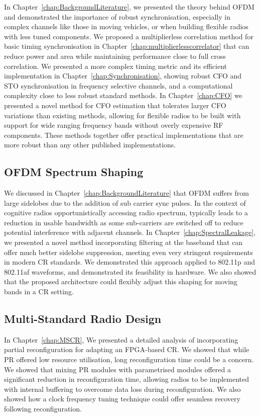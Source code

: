 In Chapter~\ref{chap:BackgroundLiterature}, we presented the theory behind OFDM and demonstrated the importance of robust synchronisation, especially in complex channels like those in moving vehicles, or when building flexible radios with less tuned components.
We proposed a multiplierless correlation method for basic timing synchronisation in Chapter~\ref{chap:multiplierlesscorrelator} that can reduce power and area while maintaining performance close to full cross correlation.
We presented a more complex timing metric and its efficient implementation in Chapter~\ref{chap:Synchronisation}, showing robust CFO and STO synchronisation in frequency selective channels, and a computational complexity close to less robust standard methods.
In Chapter~\ref{chap:CFO} we presented a novel method for CFO estimation that tolerates larger CFO variations than existing methods, allowing for flexible radios to be built with support for wide ranging frequency bands without overly expensive RF components.
These methods together offer practical implementations that are more robust than any other published implementations.

\subsection{OFDM Spectrum Shaping}
We discussed in Chapter~\ref{chap:BackgroundLiterature} that OFDM suffers from large sidelobes due to the addition of sub carrier sync pulses.
In the context of cognitive radios opportunistically accessing radio spectrum, typically leads to a reduction in usable bandwidth as some sub-carriers are switched off to reduce potential interference with adjacent channels.
In Chapter~\ref{chap:SpectralLeakage}, we presented a novel method incorporating filtering at the baseband that can offer much better sidelobe suppression, meeting even very stringent requirements in modern CR standards. We demonstrated this approach applied to 802.11p and 802.11af waveforms, and demonstrated its feasibility in hardware.
We also showed that the proposed architecture could flexibly adjust this shaping for moving bands in a CR setting.

\subsection{Multi-Standard Radio Design}

In Chapter~\ref{chap:MSCR}, We presented a detailed analysis of incorporating partial reconfiguration for adapting an FPGA-based CR.
We showed that while PR offered low resource utilisation, long reconfiguration time could be a concern. We showed that mixing PR modules with parametrised modules offered a significant reduction in reconfiguration time, allowing radios to be implemented with internal buffering to overcome data loss during reconfiguration.
We also showed how a clock frequency tuning technique could offer seamless recovery following reconfiguration.

